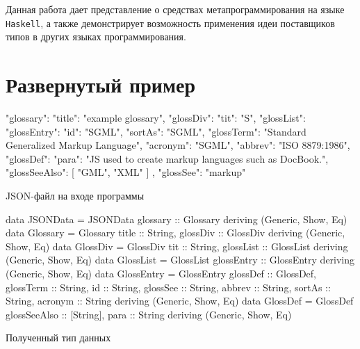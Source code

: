 Данная работа дает представление о средствах метапрограммирования на языке \lstinline{Haskell}, а также демонстрирует возможность применения идеи поставщиков типов в других языках программирования. 

\printbibliography[%
    heading=bibintoc%
]

\appendix

\chapter{Развернутый пример}

\begin{ListingEnv}[H]
\begin{Verb}
{
  "glossary": {
    "title": "example glossary",
    "glossDiv": {
      "tit": "S",
      "glossList": {
        "glossEntry": {
          "id": "SGML",
          "sortAs": "SGML",
          "glossTerm": "Standard Generalized Markup Language",
          "acronym": "SGML",
          "abbrev": "ISO 8879:1986",
          "glossDef": {
            "para": "JS used to create markup languages such as DocBook.",
            "glossSeeAlso": [
              "GML",
              "XML"
            ]
          },
          "glossSee": "markup"
        }
      }
    }
  }
}
\end{Verb}
\caption{JSON-файл на входе программы}
\label{listing:inputGreatEx}
\end{ListingEnv}

\begin{ListingEnv}[H]
\begin{Verb}
data JSONData
      = JSONData {glossary :: Glossary}
      deriving (Generic, Show, Eq)
data Glossary
      = Glossary {title :: String, glossDiv :: GlossDiv}
      deriving (Generic, Show, Eq)
data GlossDiv
      = GlossDiv {tit :: String, glossList :: GlossList}
      deriving (Generic, Show, Eq)
data GlossList
      = GlossList {glossEntry :: GlossEntry}
      deriving (Generic, Show, Eq)
data GlossEntry
      = GlossEntry {glossDef :: GlossDef,
                    glossTerm :: String,
                    id :: String,
                    glossSee :: String,
                    abbrev :: String,
                    sortAs :: String,
                    acronym :: String}
      deriving (Generic, Show, Eq)
data GlossDef
      = GlossDef {glossSeeAlso :: [String], para :: String}
      deriving (Generic, Show, Eq)
\end{Verb}
\caption{Полученный тип данных}
\label{listing:outputGreatEx}
\end{ListingEnv}


